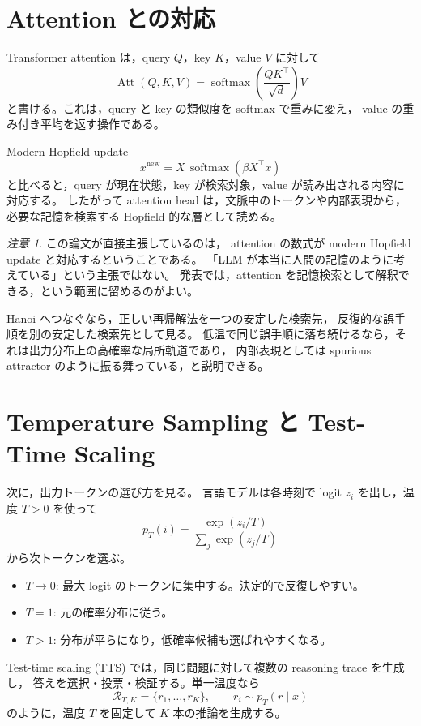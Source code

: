 \documentclass[a4paper,11pt]{ltjsarticle}
\theoremstyle{definition}
\theoremstyle{plain}
\theoremstyle{remark}
\newtheorem*{remark}{注意}
\newcommand{\softmax}{\operatorname{softmax}}
\newcommand{\Att}{\operatorname{Att}}
\begin{document}
\section{Attention との対応}

Transformer attention は，query \(Q\)，key \(K\)，value \(V\) に対して
\[
  \Att(Q,K,V)
  =
  \softmax\!\left(\frac{QK^\top}{\sqrt{d}}\right)V
\]
と書ける。これは，query と key の類似度を softmax で重みに変え，
value の重み付き平均を返す操作である。

Modern Hopfield update
\[
  x^{\mathrm{new}}
  =
  X\,\softmax(\beta X^\top x)
\]
と比べると，query が現在状態，key が検索対象，value が読み出される内容に対応する。
したがって attention head は，文脈中のトークンや内部表現から，
必要な記憶を検索する Hopfield 的な層として読める。

\begin{remark}
この論文が直接主張しているのは，
attention の数式が modern Hopfield update と対応するということである。
「LLM が本当に人間の記憶のように考えている」という主張ではない。
発表では，attention を記憶検索として解釈できる，という範囲に留めるのがよい。
\end{remark}

Hanoi へつなぐなら，正しい再帰解法を一つの安定した検索先，
反復的な誤手順を別の安定した検索先として見る。
低温で同じ誤手順に落ち続けるなら，それは出力分布上の高確率な局所軌道であり，
内部表現としては spurious attractor のように振る舞っている，と説明できる。

\section{Temperature Sampling と Test-Time Scaling}

次に，出力トークンの選び方を見る。
言語モデルは各時刻で logit \(z_i\) を出し，温度 \(T>0\) を使って
\[
  p_T(i)
  =
  \frac{\exp(z_i/T)}
       {\sum_j \exp(z_j/T)}
\]
から次トークンを選ぶ。

\begin{itemize}
\item \(T\to0\): 最大 logit のトークンに集中する。決定的で反復しやすい。
\item \(T=1\): 元の確率分布に従う。
\item \(T>1\): 分布が平らになり，低確率候補も選ばれやすくなる。
\end{itemize}

Test-time scaling (TTS) では，同じ問題に対して複数の reasoning trace を生成し，
答えを選択・投票・検証する。単一温度なら
\[
  \mathcal{R}_{T,K}
  =
  \{r_1,\ldots,r_K\},\qquad
  r_i\sim p_T(r\mid x)
\]
のように，温度 \(T\) を固定して \(K\) 本の推論を生成する。
\end{document}
